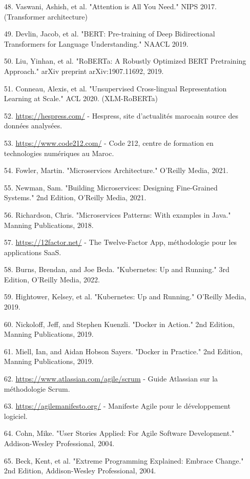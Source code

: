 \begin{itemize}[leftmargin=1cm, itemsep=0.3em, parsep=0.2em]
    \item[48.] Vaswani, Ashish, et al. "Attention is All You Need." NIPS 2017. (Transformer architecture)
    \item[49.] Devlin, Jacob, et al. "BERT: Pre-training of Deep Bidirectional Transformers for Language Understanding." NAACL 2019.
    \item[50.] Liu, Yinhan, et al. "RoBERTa: A Robustly Optimized BERT Pretraining Approach." arXiv preprint arXiv:1907.11692, 2019.
    \item[51.] Conneau, Alexis, et al. "Unsupervised Cross-lingual Representation Learning at Scale." ACL 2020. (XLM-RoBERTa)
    \item[52.] \url{https://hespress.com/} - Hespress, site d'actualités marocain source des données analysées.
    \item[53.] \url{https://www.code212.com/} - Code 212, centre de formation en technologies numériques au Maroc.
    \item[54.] Fowler, Martin. "Microservices Architecture." O'Reilly Media, 2021.
    \item[55.] Newman, Sam. "Building Microservices: Designing Fine-Grained Systems." 2nd Edition, O'Reilly Media, 2021.
    \item[56.] Richardson, Chris. "Microservices Patterns: With examples in Java." Manning Publications, 2018.
    \item[57.] \url{https://12factor.net/} - The Twelve-Factor App, méthodologie pour les applications SaaS.
    \item[58.] Burns, Brendan, and Joe Beda. "Kubernetes: Up and Running." 3rd Edition, O'Reilly Media, 2022.
    \item[59.] Hightower, Kelsey, et al. "Kubernetes: Up and Running." O'Reilly Media, 2019.
    \item[60.] Nickoloff, Jeff, and Stephen Kuenzli. "Docker in Action." 2nd Edition, Manning Publications, 2019.
    \item[61.] Miell, Ian, and Aidan Hobson Sayers. "Docker in Practice." 2nd Edition, Manning Publications, 2019.
    \item[62.] \url{https://www.atlassian.com/agile/scrum} - Guide Atlassian sur la méthodologie Scrum.
    \item[63.] \url{https://agilemanifesto.org/} - Manifeste Agile pour le développement logiciel.
    \item[64.] Cohn, Mike. "User Stories Applied: For Agile Software Development." Addison-Wesley Professional, 2004.
    \item[65.] Beck, Kent, et al. "Extreme Programming Explained: Embrace Change." 2nd Edition, Addison-Wesley Professional, 2004.

\end{itemize}
